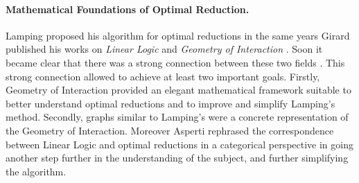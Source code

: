 \documentclass[english]{scrartcl}
\begin{document}
\paragraph{Mathematical Foundations of Optimal Reduction.}Lamping proposed his algorithm for optimal reductions in the same years Girard published his works on \emph{Linear Logic} \cite{girard_linear_1987} and \emph{Geometry of Interaction} \cite{girard_geometry_1989}. Soon it became clear that there was a strong connection between these two fields \cite{gonthier_geometry_1992,gonthier_linear_1992,guerrini_coherence_1996}. This strong connection allowed to achieve at least two important goals. Firstly, Geometry of Interaction provided an elegant mathematical framework suitable to better understand optimal reductions and to improve and simplify Lamping's method. Secondly, graphs similar to Lamping's were a concrete representation of the Geometry of Interaction. Moreover Asperti rephrased the correspondence between Linear Logic and optimal reductions in a categorical perspective in \cite{asperti_linear_1995} going another step further in the understanding of the subject, and further simplifying the algorithm.
\end{document}
